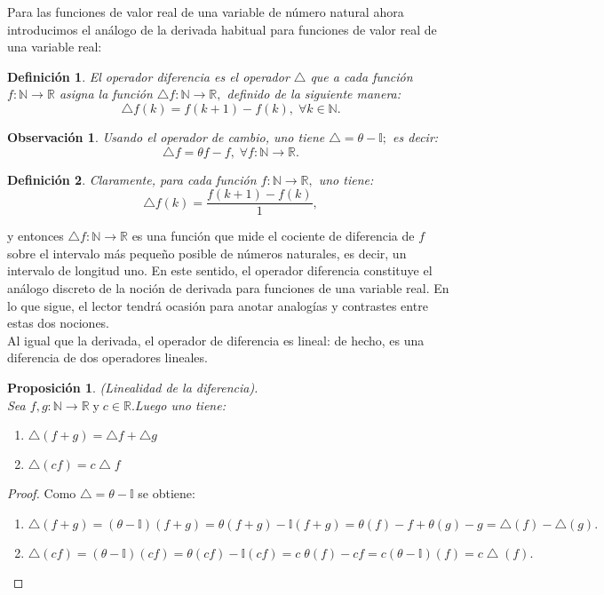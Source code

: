 \documentclass{article}
\newtheorem{defi}{Definición}[section]
\newtheorem{obs}{Observación}[section]
\newtheorem{prop}{Proposición}[section]
\begin{document}
Para las funciones de valor real de una variable de número natural ahora introducimos el análogo de la derivada habitual para funciones de valor real de una variable real:

	\begin{defi}
		El operador diferencia es el operador $ \bigtriangleup $ que a cada función $ f:\mathbb{N} \to \mathbb{R} $ asigna la función $\bigtriangleup f:\mathbb{N} \to \mathbb{R},$ definido de la siguiente manera:
		$$
		\bigtriangleup f(k)=f(k+1)-f(k), \; \forall k \in \mathbb{N}.
		$$ 
	\end{defi}
	\begin{obs}
		Usando el operador de cambio, uno tiene $ \bigtriangleup=\theta - \mathbb{I};$ es decir:
		$$
		\bigtriangleup f= \theta f-f, \; \forall f:\mathbb{N} \to \mathbb{R}.
		$$
	\end{obs}
	\begin{defi}
		Claramente, para cada función $ f: \mathbb{N} \to \mathbb{R},$ uno tiene:
		$$
		\bigtriangleup f(k)=\frac{f(k+1)-f(k)}{1},
		$$
	\end{defi}
	\noindent y entonces $ \bigtriangleup f:\mathbb{N} \to \mathbb{R} $ es una función que mide el cociente de diferencia de $ f $ sobre
	el intervalo más pequeño posible de números naturales, es decir, un intervalo de longitud uno.
	En este sentido, el operador diferencia constituye el análogo discreto de la noción de derivada para funciones de una variable real. En lo que sigue, el lector tendrá
	ocasión para anotar analogías y contrastes entre estas dos nociones.\\
	Al igual que la derivada, el operador de diferencia es lineal: de hecho, es una diferencia
	de dos operadores lineales.
	\begin{prop}
		(Linealidad de la diferencia).\\Sea $ f,g:\mathbb{N} \to \mathbb{R} \; \text{y} \; c \in \mathbb{R}.$Luego uno tiene:
		\begin{enumerate}[1.]
			\item $\bigtriangleup (f+g)= \bigtriangleup f + \bigtriangleup g$
			\item $ \bigtriangleup(cf)=c \bigtriangleup f $
		\end{enumerate}
	\end{prop}
			\begin{proof}
				 Como $ \bigtriangleup=\theta - \mathbb{I}$ se obtiene:
			\begin{enumerate}[1.]
				\item
					$\bigtriangleup(f+g)=(\theta-\mathbb{I} )(f+g)=\theta (f+g)-\mathbb{I}(f+g)=\theta(f)-f+\theta(g)-g=\bigtriangleup(f)-\bigtriangleup(g).$
				\item $\bigtriangleup(cf)=(\theta-\mathbb{I})(cf)=\theta(cf)-\mathbb{I}(cf)=c\;\theta(f)-cf=c(\theta -\mathbb{I})(f)=c \bigtriangleup(f).$
			\end{enumerate}
			\end{proof}
\end{document}
